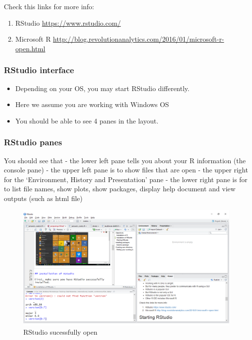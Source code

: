 \documentclass[]{book}
\providecommand{\tightlist}{%
  \setlength{\itemsep}{0pt}\setlength{\parskip}{0pt}}
\theoremstyle{definition}
\theoremstyle{definition}
\theoremstyle{remark}
\begin{document}
Check this links for more info:

\begin{enumerate}
\def\labelenumi{\arabic{enumi}.}
\tightlist
\item
  RStudio \url{https://www.rstudio.com/}
\item
  Microsoft R
  \url{http://blog.revolutionanalytics.com/2016/01/microsoft-r-open.html}
\end{enumerate}

\subsubsection{RStudio interface}\label{rstudio-interface}

\begin{itemize}
\tightlist
\item
  Depending on your OS, you may start RStudio differently.
\item
  Here we assume you are working with Windows OS
\item
  You should be able to see 4 panes in the layout.
\end{itemize}

\subsubsection{RStudio panes}\label{rstudio-panes}

You should see that - the lower left pane tells you about your R
information (the console pane) - the upper left pane is to show files
that are open - the upper right for the `Environment, History and
Presentation' pane - the lower right pane is for to list file names,
show plots, show packages, display help document and view outputs (such
as html file)

\begin{figure}
\centering
\includegraphics{rstudio.png}
\caption{RStudio sucessfully open}
\end{figure}
\end{document}
